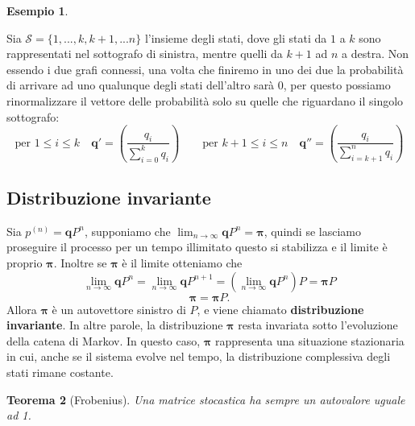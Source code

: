 \documentclass{article}
\newtheorem{theorem}{Teorema}[section]
\theoremstyle{definition}
\newtheorem{example}[theorem]{Esempio}
\theoremstyle{remark}
\begin{document}
\begin{example}
\begin{center}
\begin{tikzpicture}[x=0.75pt,y=0.75pt,yscale=-1,xscale=1]
\end{tikzpicture}

\end{center}
Sia $\mathcal{S}=\{1,...,k,k+1,...n\}$ 
l'insieme degli stati, dove gli stati da $1$ a $k$ sono rappresentati nel sottografo di sinistra, mentre quelli da $k+1$ ad $n$ a destra.
Non essendo  i due grafi connessi, una volta che finiremo in uno dei due la probabilità di arrivare ad uno
qualunque degli stati dell'altro sarà $0$, per questo possiamo rinormalizzare il vettore delle probabilità solo su quelle che riguardano il singolo
sottografo:
 $$\text{per $1\le i\le k$}\quad \mathbf{q'}=\left(\frac{q_i}{\sum_{i=0}^k q_i}\right) \qquad \text{per $k+1\le i\le n$}\quad \mathbf{q''}=\left(\frac{q_i}{\sum_{i=k+1}^n q_i}\right)$$
\end{example}
\subsection{Distribuzione invariante}
    Sia $p^{(n)} = \boldsymbol{q}P^n$, supponiamo che $\lim_{n\to\infty}\boldsymbol{q}P^n = \boldsymbol{\pi} $, quindi se lasciamo proseguire il processo
    per un tempo illimitato questo si stabilizza e il limite è proprio $\boldsymbol{\pi}$. Inoltre se $\boldsymbol{\pi}$ è il limite otteniamo che 
    $$\lim_{n\to \infty} \boldsymbol{q}P^n = \lim_{n\to \infty} \boldsymbol{q}P^{n+1} = (\lim_{n\to \infty} \boldsymbol{q}P^n)P = \boldsymbol{\pi} P$$
    $$\boldsymbol{\pi}=\boldsymbol{\pi} P.$$
    Allora $\boldsymbol{\pi}$ è un autovettore sinistro di $P$, e viene chiamato \textbf{distribuzione invariante}. In altre parole, 
    la distribuzione $\boldsymbol{\pi}$ resta invariata sotto l'evoluzione della catena di Markov. In questo caso, $\boldsymbol{\pi}$ rappresenta una situazione stazionaria in cui, anche se il sistema evolve nel tempo, 
    la distribuzione complessiva degli stati rimane costante.
\begin{theorem}[Frobenius]
    Una matrice \textit{stocastica} ha sempre un autovalore uguale ad 1.
\end{theorem}
\end{document}
